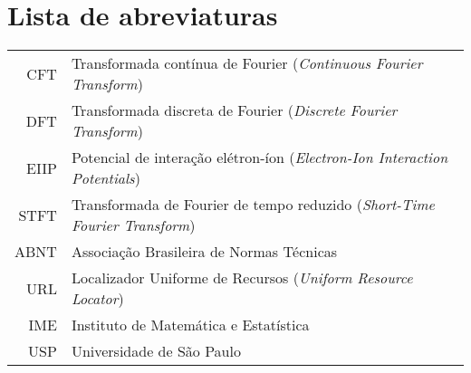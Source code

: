 \documentclass[a4paper,12pt,twoside,english,brazilian]{book}
\begin{document}

\newcommand\disablenewpage[1]{{\let\clearpage\par\let\cleardoublepage\par #1}}

\bgroup
\raggedbottom


\disablenewpage{\chapter*{Lista de abreviaturas}}

\begin{tabular}{rl}
   CFT & Transformada contínua de Fourier (\emph{Continuous Fourier Transform})\\
   DFT & Transformada discreta de Fourier (\emph{Discrete Fourier Transform})\\
  EIIP & Potencial de interação elétron-íon (\emph{Electron-Ion Interaction Potentials})\\
  STFT & Transformada de Fourier de tempo reduzido (\emph{Short-Time Fourier Transform})\\
  ABNT & Associação Brasileira de Normas Técnicas\\
   URL & Localizador Uniforme de Recursos (\emph{Uniform Resource Locator})\\
   IME & Instituto de Matemática e Estatística\\
   USP & Universidade de São Paulo
\end{tabular}
\end{document}
